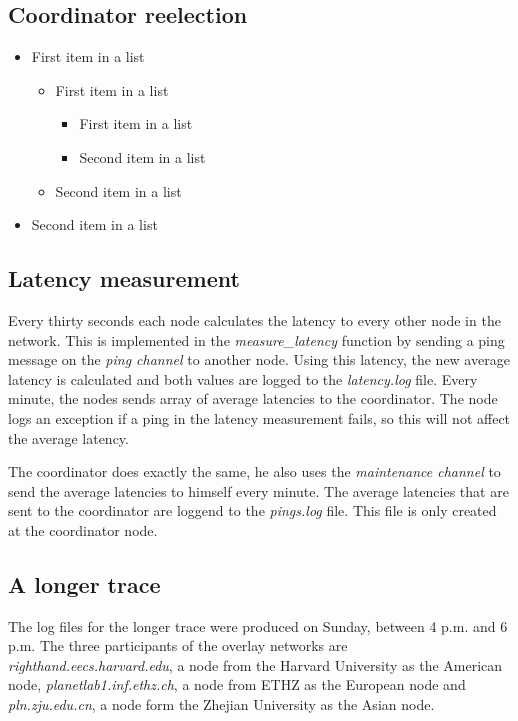 \documentclass[paper=a4, fontsize=11pt]{scrartcl} %
\numberwithin{equation}{section} %
\numberwithin{figure}{section} %
\numberwithin{table}{section} %
\begin{document}

\subsection{Coordinator reelection}
\begin{itemize}
	\item First item in a list 
		\begin{itemize}
		\item First item in a list 
			\begin{itemize}
			\item First item in a list 
			\item Second item in a list 
			\end{itemize}
		\item Second item in a list 
		\end{itemize}
	\item Second item in a list 
\end{itemize}


\subsection{Latency measurement}

Every thirty seconds each node calculates the latency to every other node in the network. This is implemented in the \textit{measure\_latency} function by sending a ping message on the \textit{ping channel} to another node. Using this latency, the new average latency is calculated and both values are logged to the \textit{latency.log} file. Every minute, the nodes sends array of average latencies to the coordinator. The node logs an exception if a ping in the latency measurement fails, so this will not affect the average latency.

The coordinator does exactly the same, he also uses the \textit{maintenance channel} to send the average latencies to himself every minute. The average latencies that are sent to the coordinator are loggend to the \textit{pings.log} file. This file is only created at the coordinator node.

\subsection{A longer trace}

The log files for the longer trace were produced on Sunday, between 4 p.m. and 6 p.m. The three participants of the overlay networks are \textit{righthand.eecs.harvard.edu}, a node from the Harvard University as the American node, \textit{planetlab1.inf.ethz.ch}, a node from ETHZ as the European node and \textit{pln.zju.edu.cn}, a node form the Zhejian University as the Asian node.
\end{document}
